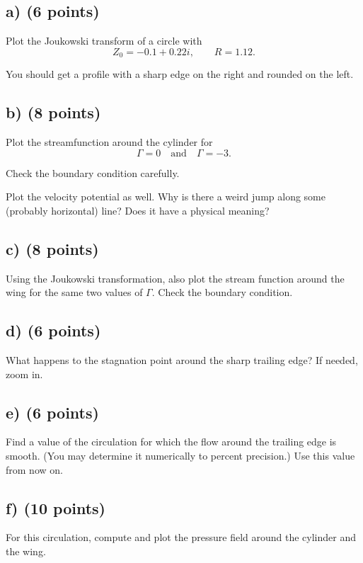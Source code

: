 \documentclass[11pt,a4paper]{article}
\begin{document}
\subsection*{a) (6 points)}

Plot the Joukowski transform of a circle with
\[
Z_0 = -0.1 + 0.22i, \qquad R = 1.12.
\]

You should get a profile with a sharp edge on the right and rounded on the left.

\subsection*{b) (8 points)}

Plot the streamfunction around the cylinder for
\[
\Gamma = 0 \quad \text{and} \quad \Gamma = -3.
\]

Check the boundary condition carefully.

Plot the velocity potential as well. Why is there a weird jump along some (probably horizontal) line?
Does it have a physical meaning?

\subsection*{c) (8 points)}

Using the Joukowski transformation, also plot the stream function around the wing
for the same two values of $\Gamma$.
Check the boundary condition.

\subsection*{d) (6 points)}

What happens to the stagnation point around the sharp trailing edge?
If needed, zoom in.

\subsection*{e) (6 points)}

Find a value of the circulation for which the flow around the trailing edge is smooth.
(You may determine it numerically to percent precision.)
Use this value from now on.

\subsection*{f) (10 points)}

For this circulation, compute and plot the pressure field around the cylinder and the wing.
\end{document}
